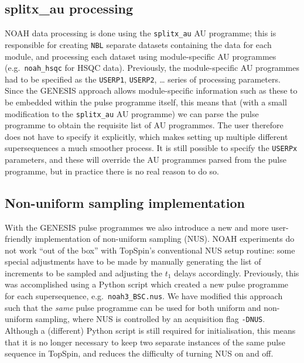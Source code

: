 \documentclass[a4paper,11pt]{article}
\newcommand{\carbon}{\ch{^{13}C}}
\begin{document}
\begin{refsection}
\subsection{splitx\_au processing}
\label{subsec:splitx_au}

NOAH data processing is done using the \texttt{splitx\_au} AU programme; this is responsible for creating \texttt{NBL} separate datasets containing the data for each module, and processing each dataset using module-specific AU programmes (e.g.\ \texttt{noah\_hsqc} for \carbon{} HSQC data).
Previously, the module-specific AU programmes had to be specified as the \texttt{USERP1}, \texttt{USERP2}, \ldots{} series of processing parameters.
Since the GENESIS approach allows module-specific information such as these to be embedded within the pulse programme itself, this means that (with a small modification to the \texttt{splitx\_au} AU programme) we can parse the pulse programme to obtain the requisite list of AU programmes.
The user therefore does not have to specify it explicitly, which makes setting up multiple different supersequences a much smoother process.
It is still possible to specify the \texttt{USERPx} parameters, and these will override the AU programmes parsed from the pulse programme, but in practice there is no real reason to do so.

\subsection{Non-uniform sampling implementation}
\label{subsec:nus}

With the GENESIS pulse programmes we also introduce a new and more user-friendly implementation of non-uniform sampling (NUS).
NOAH experiments do not work ``out of the box'' with TopSpin's conventional NUS setup routine: some special adjustments have to be made by manually generating the list of increments to be sampled and adjusting the \(t_1\) delays accordingly.
Previously, this was accomplished using a Python script which created a new pulse programme for each supersequence, e.g.\ \texttt{noah3\_BSC.nus}.\autocite{Claridge2019MRC}
We have modified this approach such that the \textit{same} pulse programme can be used for both uniform and non-uniform sampling, where NUS is controlled by an acquisition flag \texttt{-DNUS}.
Although a (different) Python script is still required for initialisation, this means that it is no longer necessary to keep two separate instances of the same pulse sequence in TopSpin, and reduces the difficulty of turning NUS on and off.



\end{refsection}
\end{document}
